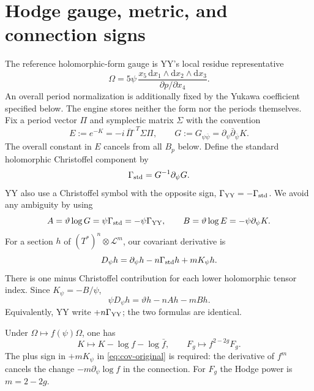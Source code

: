 \documentclass[11pt,a4paper]{article}
\numberwithin{equation}{section}
\newcommand{\dd}{\mathrm d}
\newcommand{\bdel}{\bar\partial_{\bar\psi}}
\newcommand{\tht}{\vartheta}
\newcommand{\del}{\partial}
\begin{document}
\section{Hodge gauge, metric, and connection signs}

The reference holomorphic-form gauge is YY's local residue representative
\begin{equation}
\Omega=5\psi\,\frac{x_5\,\dd x_1\wedge\dd x_2\wedge\dd x_3}
                         {\del p/\del x_4}.
\end{equation}
An overall period normalization is additionally fixed by the Yukawa coefficient
specified below. The engine stores neither the form nor the periods themselves.
Fix a period vector $\Pi$ and symplectic matrix $\Sigma$ with the convention
\begin{equation}
E:=e^{-K}=-i\,\bar\Pi^{,T}\Sigma\Pi,\qquad
G:=G_{\psi\bar\psi}=\del_\psi\bdel K.
\end{equation}
The overall constant in $E$ cancels from all $B_p$ below. Define the
standard holomorphic Christoffel component by
\begin{equation}
\Gamma_{\rm std}=G^{-1}\del_\psi G.
\end{equation}
YY also use a Christoffel symbol with the opposite sign,
$\Gamma_{\rm YY}=-\Gamma_{\rm std}$. We avoid any ambiguity by using
\begin{equation}
A=\tht\log G=\psi\Gamma_{\rm std}
              =-\psi\Gamma_{\rm YY},\qquad
B=\tht\log E=-\psi\del_\psi K.
\label{eq:ABconnections}
\end{equation}
For a section $h$ of $(T^*)^n\otimes\mathcal L^m$, our covariant derivative is
\begin{equation}
D_\psi h=\del_\psi h-n\Gamma_{\rm std}h+mK_\psi h.
\label{eq:cov-original}
\end{equation}
There is one minus Christoffel contribution for each lower holomorphic tensor
index. Since $K_\psi=-B/\psi$,
\begin{equation}
\psi D_\psi h=\tht h-nAh-mBh.
\end{equation}
Equivalently, YY write $+n\Gamma_{\rm YY}$; the two formulas are identical.

Under $\Omega\mapsto f(\psi)\Omega$, one has
\begin{equation}
K\mapsto K-\log f-\log\bar f,\qquad
F_g\mapsto f^{2-2g}F_g.
\end{equation}
The plus sign in $+mK_\psi$ in \eqref{eq:cov-original} is required:
the derivative of $f^m$ cancels the change $-m\del_\psi\log f$
in the connection. For $F_g$ the Hodge power is $m=2-2g$.
\end{document}
